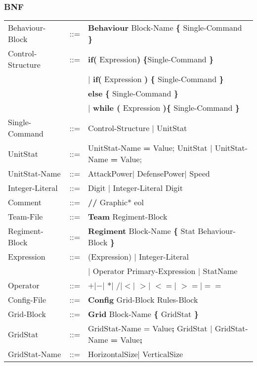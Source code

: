 	\subsubsection{BNF}
		\begin{tabular}{ l l l }
			Behaviour-Block	   &	::=	 & {\bf Behaviour} Block-Name {\bf \{} Single-Command {\bf \}} \\
			Control-Structure  &  	::=  & {\bf if( } Expression{\bf )} {\bf \{}Single-Command {\bf \}}  \\
							   &		 & $\mid$ {\bf if(} Expression {\bf )} {\bf \{ }Single-Command {\bf \}} \\
							   &   		 & {\bf else } {\bf \{ }Single-Command {\bf \} } \\					   
							   &   		 & $\mid$ {\bf while (} Expression {\bf )}{\bf \{ } Single-Command {\bf \}} \\
			Single-Command     &	::=  & Control-Structure $\mid$ UnitStat \\
			UnitStat		   &	::=  & UnitStat-Name {\bf =} Value; UnitStat $\mid$ UnitStat-Name {\bf = } Value; \\
			UnitStat-Name	   &	::=	 & AttackPower$\mid$ DefensePower$\mid$ Speed \\
			Integer-Literal    &	::=  & Digit $\mid$ Integer-Literal Digit \\
			Comment			   &	::=	 & {\bf //} Graphic* eol \\
			Team-File		   &	::=	 & {\bf Team} Regiment-Block \\
			Regiment-Block     &	::=	 & {\bf Regiment} Block-Name {\bf \{ } Stat Behaviour-Block \bf{\} }\\
			Expression		   &	::=  & (Expression) $\mid$ Integer-Literal \\
							   &		 &	$\mid$ Operator Primary-Expression $\mid$ StatName \\
			Operator 		   & 	::=	 & {\bf $+$}$\mid${\bf $-$}$\mid$ {\bf $*$}$\mid$ 
											{\bf $/$}$\mid${\bf $<$}$\mid$ {\bf $>$}$\mid$ 
											{\bf $<=$}$\mid$ {\bf $>=$}$\mid${\bf $==$}\\
			Config-File		   & 	::=  & {\bf Config} Grid-Block Rules-Block  		\\
			Grid-Block		   &	::=	 & {\bf Grid} Block-Name	 {\bf \{} GridStat \bf{\}} \\
			GridStat		   &	::=  & GridStat-Name = Value{\bf ;} GridStat $\mid$ GridStat-Name {\bf =} Value{\bf ;}   \\
			GridStat-Name	   &	::=  & HorizontalSize$\mid$ VerticalSize					\\

\end{tabular}
